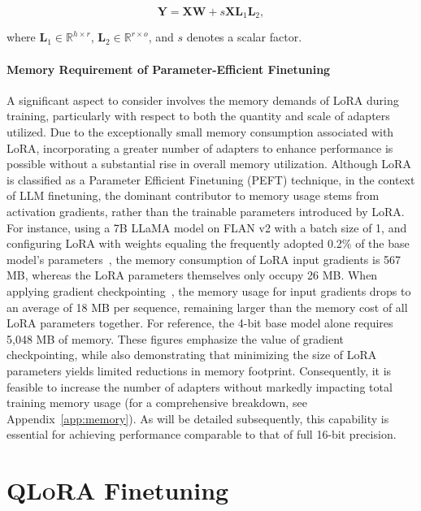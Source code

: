 \begin{equation}
    \mathbf{Y} = \mathbf{X}\mathbf{W} + s\mathbf{X}\mathbf{L}_1\mathbf{L}_2,
\end{equation}

where $\mathbf{L}_1\in  \mathbb{R}^{h\times r}$, $\mathbf{L}_2\in  \mathbb{R}^{r\times o}$, and $s$ denotes a scalar factor.

\paragraph{Memory Requirement of Parameter-Efficient Finetuning} A significant aspect to consider involves the memory demands of LoRA during training, particularly with respect to both the quantity and scale of adapters utilized. Due to the exceptionally small memory consumption associated with LoRA, incorporating a greater number of adapters to enhance performance is possible without a substantial rise in overall memory utilization. Although LoRA is classified as a Parameter Efficient Finetuning (PEFT) technique, in the context of LLM finetuning, the dominant contributor to memory usage stems from activation gradients, rather than the trainable parameters introduced by LoRA. For instance, using a 7B LLaMA model on FLAN v2 with a batch size of 1, and configuring LoRA with weights equaling the frequently adopted 0.2\% of the base model's parameters~\citep{hu2021lora,liu2022few}, the memory consumption of LoRA input gradients is 567 MB, whereas the LoRA parameters themselves only occupy 26 MB. When applying gradient checkpointing~\citep{chen2016training}, the memory usage for input gradients drops to an average of 18 MB per sequence, remaining larger than the memory cost of all LoRA parameters together. For reference, the 4-bit base model alone requires 5,048 MB of memory. These figures emphasize the value of gradient checkpointing, while also demonstrating that minimizing the size of LoRA parameters yields limited reductions in memory footprint. Consequently, it is feasible to increase the number of adapters without markedly impacting total training memory usage (for a comprehensive breakdown, see Appendix~\ref{app:memory}). As will be detailed subsequently, this capability is essential for achieving performance comparable to that of full 16-bit precision.

\section{\textsc{QLoRA} Finetuning}

